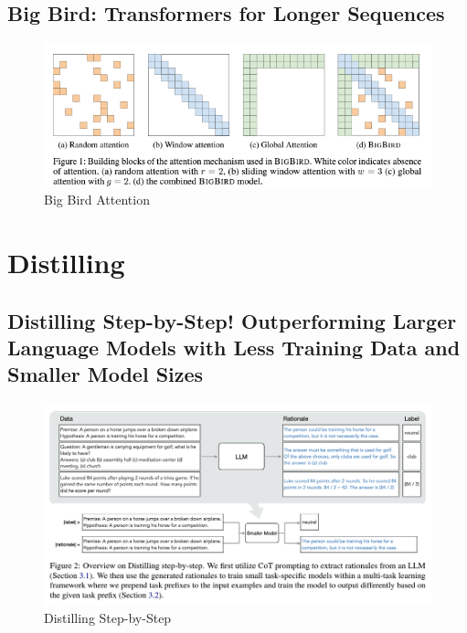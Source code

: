 \documentclass[11pt]{article}
\theoremstyle{definition}
\begin{document}
\subsection{Big Bird: Transformers for Longer Sequences}

\begin{figure}
\centering
  \includegraphics[width=\textwidth,height=\textheight,keepaspectratio]{transformers/big_bird.png}
  \caption{Big Bird Attention \cite{bigbird}}
  \label{fig:bigbird}
\end{figure}

\section{Distilling}

\subsection{Distilling Step-by-Step! Outperforming Larger Language Models with Less Training Data and Smaller Model Sizes}

\begin{figure}
\centering
  \includegraphics[width=\textwidth,height=\textheight,keepaspectratio]{transformers/distilling_step_by_step.png}
  \caption{Distilling Step-by-Step \cite{hsieh2023distilling}}
  \label{fig:distilling_step_by_step}
\end{figure}
\end{document}
